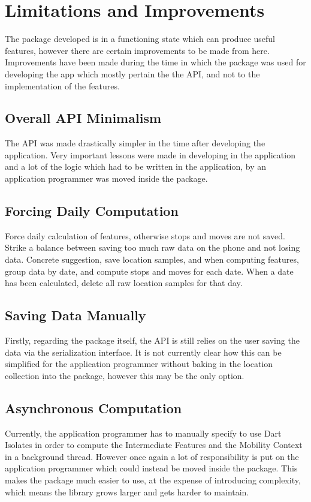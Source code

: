 \section{Limitations and Improvements}
The package developed is in a functioning state which can produce useful features, however there are certain improvements to be made from here. Improvements have been made during the time in which the package was used for developing the app which mostly pertain the the API, and not to the implementation of the features. 

\subsection{Overall API Minimalism}
The API was made drastically simpler in the time after developing the application. Very important lessons were made in developing in the application and a lot of the logic which had to be written in the application, by an application programmer was moved inside the package.

\subsection{Forcing Daily Computation}
Force daily calculation of features, otherwise stops and moves are not saved. Strike a balance between saving too much raw data on the phone and not losing data. Concrete suggestion, save location samples, and when computing features, group data by date, and compute stops and moves for each date. When a date has been calculated, delete all raw location samples for that day.

\subsection{Saving Data Manually}
Firstly, regarding the package itself, the API is still relies on the user saving the data via the serialization interface. It is not currently clear how this can be simplified for the application programmer without baking in the location collection into the package, however this may be the only option. 

\subsection{Asynchronous Computation}
Currently, the application programmer has to manually specify to use Dart Isolates in order to compute the Intermediate Features and the Mobility Context in a background thread. However once again a lot of responsibility is put on the application programmer which could instead be moved inside the package. This makes the package much easier to use, at the expense of introducing complexity, which means the library grows larger and gets harder to maintain.

